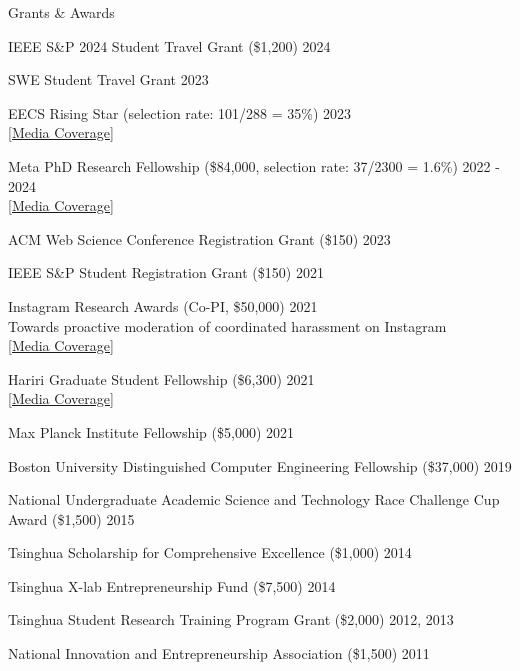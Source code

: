 \documentclass[12pt]{resume}
\begin{document}
\begin{rSection}{Grants \& Awards}
\item IEEE S\&P 2024 Student Travel Grant (\$1,200) \hfill 2024
\item SWE Student Travel Grant \hfill  2023
\item EECS Rising Star (selection rate: 101/288 = 35\%) \hfill 2023\\
\href{https://eecsrisingstars2023.cc.gatech.edu/participants/Chen_Ling/}{[Media Coverage]}
\item Meta PhD Research Fellowship (\$84,000, selection rate: 37/2300 = 1.6\%) \hfill  2022 - 2024\\
\href{https://research.facebook.com/fellows/ling-cheng/}{[Media Coverage]}
\item ACM Web Science Conference Registration Grant (\$150) \hfill 2023
\item IEEE S\&P Student Registration Grant (\$150) \hfill 2021
\item  Instagram Research Awards (Co-PI, \$50,000) \hfill  2021\\
Towards proactive moderation of coordinated harassment on Instagram\\
\href{https://research.facebook.com/blog/2021/12/announcing-the-recipients-of-instagram-research-awards-on-safety-and-community-health/}{[Media Coverage]}
\item 
Hariri Graduate Student Fellowship (\$6,300) \hfill 2021\\
\href{https://www.bu.edu/hic/profile/chen-ling/}{[Media Coverage]} 
\item Max Planck Institute Fellowship (\$5,000) \hfill 2021
\item Boston University Distinguished Computer Engineering Fellowship (\$37,000) \hfill 2019
\item National Undergraduate Academic Science and Technology Race Challenge
Cup Award (\$1,500) \hfill 2015
\item Tsinghua Scholarship for Comprehensive Excellence (\$1,000) \hfill 2014
\item Tsinghua X-lab Entrepreneurship Fund (\$7,500) \hfill 2014
\item Tsinghua Student Research Training Program Grant (\$2,000) \hfill 2012, 2013
\item National Innovation and Entrepreneurship Association (\$1,500) \hfill 2011
\end{rSection}
\end{document}
